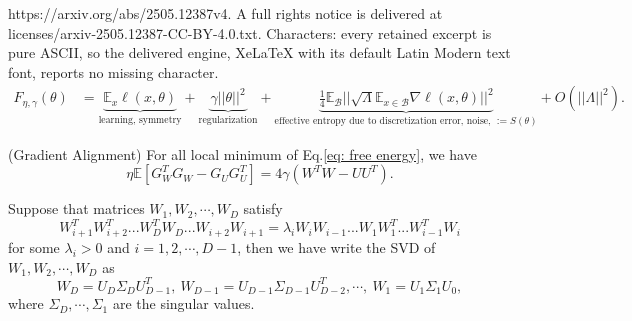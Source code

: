 \documentclass[10pt,a4paper]{amsart}
\newcommand{\E}{\mathbb{E}}
\begin{document}
https://arxiv.org/abs/2505.12387v4. A full rights notice is delivered at licenses/arxiv-2505.12387-CC-BY-4.0.txt. Characters: every retained excerpt is pure ASCII, so the delivered engine, XeLaTeX with its default Latin Modern text font, reports no missing character.
\begin{align}
\label{eq: free energy}
F_{\eta,\gamma}(\theta)&=\underbrace{\mathbb{E}_x\ell(x,\theta)}_{\text{learning, symmetry}}+\underbrace{\gamma||\theta||^2}_{\text{regularization}} +\underbrace{\frac{1}{4}\mathbb{E}_\mathcal{B}||\sqrt{\Lambda}\mathbb{E}_{x\in\mathcal{B}}  \nabla \ell(x,\theta)||^2 }_{\text{effective entropy due to discretization error, noise, $:=S(\theta)$}} +  O(||\Lambda||^2).
\end{align}

\begin{theorem}
\label{theo:attention}
(Gradient Alignment) For all local minimum of Eq.\eqref{eq: free energy}, we have
\begin{equation}
\eta\E[G_W^T G_W-G_U G_U^T]=4\gamma(W^TW-UU^T).
\end{equation}

\end{theorem}

\begin{lemma}
\label{lemma:decomposition}
Suppose that matrices $W_1,W_2,\cdots,W_D$ satisfy
\begin{equation}
W_{i+1}^TW_{i+2}^T...W_D^TW_D...W_{i+2}W_{i+1}=\lambda_iW_iW_{i-1}...W_1W_1^T...W_{i-1}^TW_i
\end{equation}
for some $\lambda_i>0$ and $i=1,2,\cdots,D-1$, then we have write the SVD of $W_1,W_2,\cdots,W_D$ as
\begin{equation}
W_D=U_D\Sigma_DU_{D-1}^T,\ W_{D-1}=U_{D-1}\Sigma_{D-1}U_{D-2}^T,\cdots,\ W_1=U_1\Sigma_1U_0,
\end{equation}
where $\Sigma_D,\cdots,\Sigma_1$ are the singular values.
\end{lemma}
\end{document}
